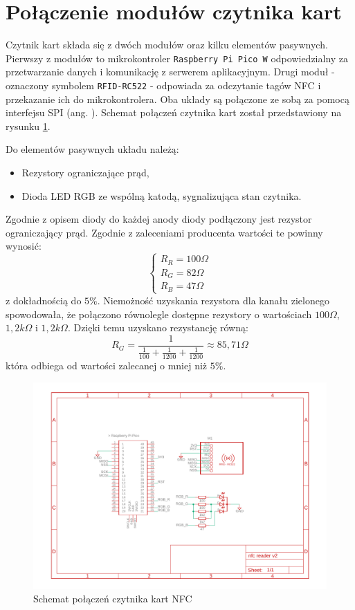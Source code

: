 \section{Połączenie modułów czytnika kart}

Czytnik kart składa się z dwóch modułów oraz kilku elementów pasywnych. Pierwszy z modułów to mikrokontroler \texttt{Raspberry Pi Pico W} odpowiedzialny za przetwarzanie danych i komunikację z serwerem aplikacyjnym. Drugi moduł - oznaczony symbolem \texttt{RFID-RC522} - odpowiada za odczytanie tagów NFC i przekazanie ich do mikrokontrolera. Oba układy są połączone ze sobą za pomocą interfejsu SPI (ang. ). Schemat połączeń czytnika kart został przedstawiony na rysunku \ref{fig:readerConnection}.

Do elementów pasywnych układu należą:
\begin{itemize}
    \item Rezystory ograniczające prąd,
    \item Dioda LED RGB ze wspólną katodą, sygnalizująca stan czytnika.
\end{itemize}

Zgodnie z opisem diody do każdej anody diody podłączony jest rezystor ograniczający prąd. Zgodnie z zaleceniami producenta wartości te powinny wynosić:
\begin{equation}
    \begin{cases}
        R_R=100\Omega \\
        R_G=82\Omega  \\
        R_B=47\Omega
    \end{cases}
\end{equation}
z dokładnością do $5\%$. Niemożność uzyskania rezystora dla kanału zielonego spowodowała, że połączono równolegle dostępne rezystory o wartościach $100\Omega$, $1,2k\Omega$ i $1,2k\Omega$. Dzięki temu uzyskano rezystancję równą:
\begin{equation}
    R_G = \frac{1}{\frac{1}{100}+\frac{1}{1200}+\frac{1}{1200}} \approx 85,71\Omega
\end{equation}
która odbiega od wartości zalecanej o mniej niż $5\%$.
\begin{figure}[H]
    \centering
    \includegraphics[width=\textwidth]{graf/nfcReader.pdf}
    \caption{Schemat połączeń czytnika kart NFC}
    \label{fig:readerConnection}
\end{figure}